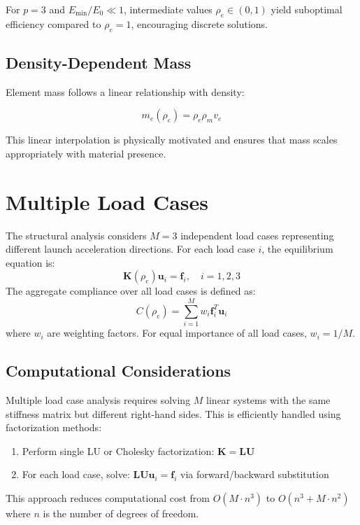 \documentclass[11pt]{report}
\newcommand{\vect}[1]{\boldsymbol{#1}}
\newcommand{\matr}[1]{\mathbf{#1}}
\newcommand{\rhoe}{\rho_e}
\newcommand{\youngs}{E}
\newcommand{\youngszero}{\youngs_0}
\newcommand{\penalty}{p}
\newcommand{\loadvect}{\vect{f}}
\newcommand{\dispvect}{\vect{u}}
\newcommand{\stiffmat}{\matr{K}}
\newcommand{\compliance}{C}
\begin{document}
For $\penalty = 3$ and $\youngs_{\text{min}}/\youngszero \ll 1$, intermediate values $\rhoe \in (0,1)$ yield suboptimal efficiency compared to $\rhoe = 1$, encouraging discrete solutions.

\subsection{Density-Dependent Mass}
Element mass follows a linear relationship with density:

\begin{equation}
m_e(\rhoe) = \rhoe \rho_m v_e
\end{equation}

This linear interpolation is physically motivated and ensures that mass scales appropriately with material presence.

\section{Multiple Load Cases}
The structural analysis considers $M = 3$ independent load cases representing
different launch acceleration directions. For each load case $i$, the equilibrium equation is:
\begin{equation}
\stiffmat(\rhoe) \dispvect_i = \loadvect_i, \quad i = 1, 2, 3
\end{equation}
The aggregate compliance over all load cases is defined as:
\begin{equation}
\compliance(\rhoe) = \sum_{i=1}^{M} w_i \loadvect_i^T \dispvect_i
\end{equation}
where $w_i$ are weighting factors. For equal importance of all load cases, $w_i = 1/M$.
\subsection{Computational Considerations}
Multiple load case analysis requires solving $M$ linear systems with the same stiffness matrix but different right-hand sides. This is efficiently handled using factorization methods:
\begin{enumerate}
    \item Perform single LU or Cholesky factorization: $\stiffmat = \matr{L} \matr{U}$
    \item For each load case, solve: $\matr{L} \matr{U} \dispvect_i = \loadvect_i$ via forward/backward substitution
\end{enumerate}
This approach reduces computational cost from $O(M \cdot n^3)$ to $O(n^3 + M \cdot n^2)$ where $n$ is the number of degrees of freedom.
\end{document}
